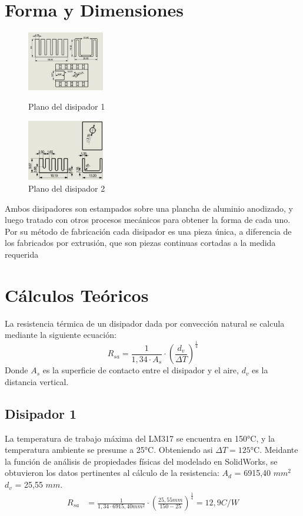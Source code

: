 \documentclass[conference]{IEEEtran}
\begin{document}
\section{Forma y Dimensiones}
\begin{figure}[h]
    \centering
    \includegraphics[width=0.3\textwidth]{PlanoRamiCompleto.png}
    \caption{Plano del disipador 1}
    \centering
    \includegraphics[width=0.3\textwidth]{disipadorFacu.png}
    \caption{Plano del disipador 2}
\end{figure}
Ambos disipadores son estampados sobre una plancha de aluminio anodizado, y luego tratado con otros 
procesos mecánicos para obtener la forma de cada uno. Por su método de fabricación cada disipador
es una pieza única, a diferencia de los fabricados por extrusión, que son piezas continuas cortadas 
a la medida requerida

\section{Cálculos Teóricos}
La resistencia térmica de un disipador dada por convección natural se calcula mediante la siguiente
ecuación:
\begin{equation}
    R_{sa} = \frac{1}{1,34\cdot A_s}\cdot (\frac{d_v}{\Delta T})^{\frac{1}{4}}
\end{equation}
Donde $A_s$ es la superficie de contacto entre el disipador y el aire, $d_v$ es la distancia vertical.
\subsection{Disipador 1}
La temperatura de trabajo máxima del LM317 se encuentra en 150°C, y la temperatura ambiente
se presume a 25°C. Obteniendo asi $\Delta T = 125$°C.
Meidante la función de análisis de propiedades físicas del modelado en SolidWorks, se obtuvieron
los datos pertinentes al cálculo de la resistencia:
$A_d$ = 6915,40 $mm^2$
$d_v$ = 25,55 $mm$.
\begin{align*}
    R_{sa} &= \frac{1}{1,34\cdot 6915,40mm^2}\cdot \left(\frac{25,55mm}{150-25}\right)^{\frac{1}{4}} = 12,9 C/W
\end{align*}
\end{document}
